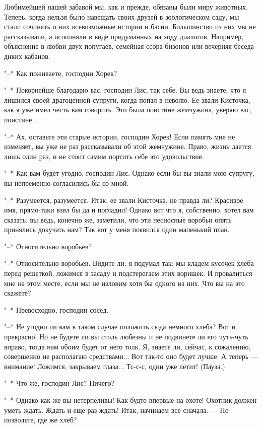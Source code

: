 Любимейшей нашей забавой мы, как и прежде, обязаны были миру животных.
Теперь, когда нельзя было навещать  своих друзей в зоологическом саду,
мы стали сочинять  о них всевозможные истории и  басни. Большинство из
них  мы  не рассказывали,  а  исполняли  в  виде придуманных  на  ходу
диалогов. Например,  объяснение в любви двух  попугаев, семейная ссора
бизонов или вечерняя беседа диких кабанов.

"--* Как поживаете, господин Хорек?

"--* Покорнейше благодарю вас, господин Лис, так себе. Вы ведь знаете,
что  я лишился  своей драгоценной  супруги, когда  попал в  неволю. Ее
звали Кисточка, как  я уже имел честь вам говорить.  Это была поистине
жемчужина, уверяю вас, поистине...

"--* Ах, оставьте эти старые  истории, господин Хорек! Если память мне
не  изменяет, вы  уже не  раз рассказывали  об этой  жемчужине. Право,
жизнь  дается  лишь один  раз,  и  не  стоит  самим портить  себе  это
удовольствие.

"--* Как вам  будет угодно, господин Лис. Однако если  бы вы знали мою
супругу, вы непременно согласились бы со мной.

"--* Разумеется,  разумеется. Итак, ее  звали Кисточка, не  правда ли?
Красивое имя,  прямо-таки взял  бы да  и погладил!  Однако вот  что я,
собственно, хотел вам сказать: вы  ведь, конечно же, заметили, что эти
несносные  воробьи  опять  принялись  докучать нам?  Так  вот  у  меня
появился один маленький план.

"--* Относительно воробьев?

"--*  Относительно  воробьев. Видите  ли,  я  подумал так:  мы  кладем
кусочек хлеба  перед решеткой,  ложимся в  засаду и  подстерегаем этих
воришек. И провалиться  мне на этом месте, если мы  не изловим хотя бы
одного из них. Что вы на это скажете?

"--* Превосходно, господин сосед.

"--* Не угодно ли вам в  таком случае положить сюда немного хлеба? Вот
и прекрасно! Но  не будете ли вы  столь любезны и не  подвинете ли его
чуть-чуть вправо,  тогда нам обоим будет  от него толк. Я,  знаете ли,
сейчас, к сожалению, совершенно не располагаю средствами... Вот так-то
оно будет  лучше. А теперь  --- внимание! Ложимся,  закрываем глаза...
Тс-с-с, один уже летит! (Пауза.)

"--* Что же, господин Лис? Ничего?

"--* Однако как же вы нетерпеливы! Как будто впервые на охоте! Охотник
должен уметь ждать. Ждать и еще раз ждать! Итак, начинаем все сначала.
--- Но позвольте, где же хлеб?

